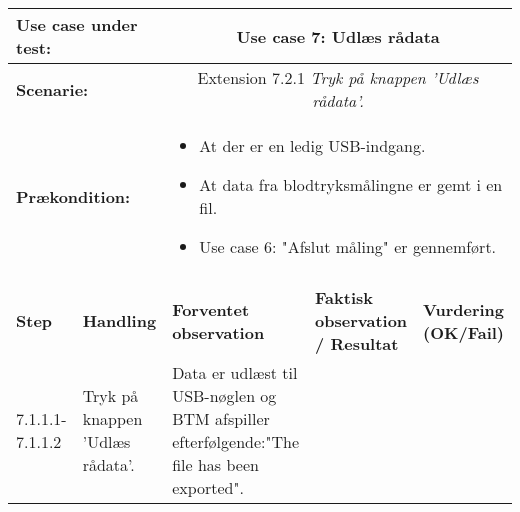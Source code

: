 \begin{tabular}{|p{1cm}|p{3cm}|p{4cm}|p{4cm}|p{2cm}|}
\hline
\multicolumn{2}{|p{3cm}|}{\textbf{Use case under test:}} & \multicolumn{3}{c|}{Use case 7: Udlæs rådata} \\\hline

\multicolumn{2}{|p{3cm}|}{\textbf{Scenarie:}} & \multicolumn{3}{c|}{Extension 7.2.1 \textit{Tryk på knappen 'Udlæs rådata'.}} \\\hline

\multicolumn{2}{|p{3cm}|}{\textbf{Prækondition:}}  & \multicolumn{3}{l|}{\parbox{0.6\textwidth}{
\begin{itemize}[label=$\circ$]
\item At der er en ledig USB-indgang.
\item At data fra blodtryksmålingne er gemt i en fil. 
\item Use case 6: "Afslut måling" er gennemført. 
\end{itemize} }}\\\hline

\multicolumn{5}{|c|}{} \\\hline

\textbf{Step} & \textbf{Handling} & \textbf{Forventet observation} & \textbf{Faktisk observation / Resultat} & \textbf{Vurdering (OK/Fail)}\\\hline

7.1.1.1-7.1.1.2 & Tryk på knappen 'Udlæs rådata'. & Data er udlæst til USB-nøglen og BTM afspiller efterfølgende:"The file has been exported". & & \\\hline

\end{tabular}


